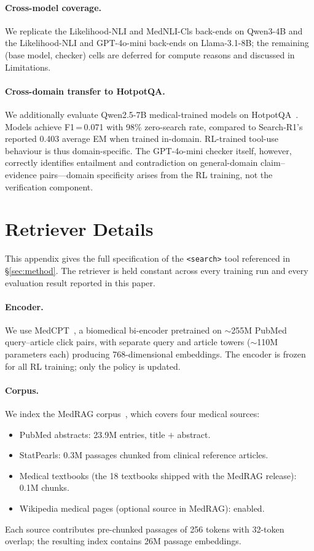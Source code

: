 \documentclass[11pt]{article}
\begin{document}
\paragraph{Cross-model coverage.}
We replicate the Likelihood-NLI and MedNLI-Cls
back-ends on Qwen3-4B and the Likelihood-NLI and
GPT-4o-mini back-ends on Llama-3.1-8B; the remaining
(base model, checker) cells are deferred for compute
reasons and discussed in Limitations.
 
\paragraph{Cross-domain transfer to HotpotQA.}
We additionally evaluate Qwen2.5-7B medical-trained 
models on HotpotQA~\citep{yang2018hotpotqa}. Models 
achieve F1\,=\,0.071 with 98\% zero-search rate, 
compared to Search-R1's reported 0.403 average EM 
when trained in-domain. RL-trained tool-use behaviour 
is thus domain-specific. The GPT-4o-mini checker 
itself, however, correctly identifies entailment and 
contradiction on general-domain claim--evidence 
pairs---domain specificity arises from the RL 
training, not the verification component.
 
\section{Retriever Details}
\label{app:retriever}

This appendix gives the full specification of the
\texttt{<search>} tool referenced in
\S\ref{sec:method}. The retriever is held constant
across every training run and every evaluation result
reported in this paper.

\paragraph{Encoder.}
We use MedCPT~\citep{jin2023medcpt}, a biomedical
bi-encoder pretrained on $\sim$255M PubMed
query--article click pairs, with separate query and
article towers ($\sim$110M parameters each) producing
768-dimensional embeddings. The encoder is frozen for
all RL training; only the policy is updated.

\paragraph{Corpus.}
We index the
MedRAG corpus~\citep{xiong2024benchmarking}, which
covers four medical sources:
\begin{itemize}
\item PubMed abstracts:
23.9M entries, title $+$ abstract.
\item StatPearls: 0.3M passages
chunked from clinical reference articles.
\item Medical textbooks (the 18 textbooks shipped with
the MedRAG release): 0.1M
chunks.
\item Wikipedia medical pages (optional source in
MedRAG): enabled.
\end{itemize}
Each source contributes pre-chunked passages of
 256 tokens with
32-token overlap; the resulting index
contains 26M passage embeddings.
\end{document}
